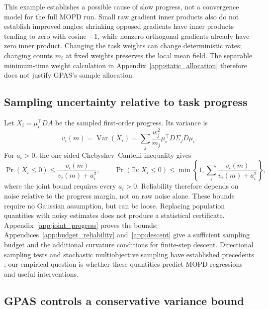 This example establishes a possible cause of slow progress, not a
convergence model for the full MOPD run. Small raw gradient inner products
also do not establish improved angles: shrinking opposed gradients have
inner products tending to zero with cosine $-1$, while nonzero orthogonal
gradients already have zero inner product.
Changing the task weights can change deterministic rates; changing counts
$m_i$ at fixed weights preserves the local mean field. The separable
minimum-time weight calculation in Appendix~\ref{app:static_allocation}
therefore does not justify GPAS's sample allocation.

\subsection{Sampling uncertainty relative to task progress}

Let $X_i=\mu_i^\top DA$ be the sampled first-order progress. Its variance is
\begin{equation}
    v_i(m)=\operatorname{Var}(X_i)
      =\sum_j\frac{w_j^2}{m_j}
          \mu_i^\top D\Sigma_jD\mu_i.
    \label{eq:directional_variance}
\end{equation}
For $a_i>0$, the one-sided Chebyshev--Cantelli inequality gives
\begin{equation}
    \Pr(X_i\leq0)\leq\frac{v_i(m)}{v_i(m)+a_i^2},\qquad
    \Pr(\exists i:X_i\leq0)
      \leq\min\!\left\{1,\sum_i\frac{v_i(m)}{v_i(m)+a_i^2}\right\},
    \label{eq:directional_reliability}
\end{equation}
where the joint bound requires every $a_i>0$. Reliability therefore
depends on noise relative to the progress margin, not on raw noise alone.
These bounds require no Gaussian assumption, but can be loose. Replacing
population quantities with noisy estimates does not produce a statistical
certificate. Appendix~\ref{app:joint_progress} proves the bounds;
Appendices~\ref{app:budget_reliability} and~\ref{app:descent} give a
sufficient sampling budget and the additional curvature conditions for
finite-step descent. Directional sampling tests and stochastic
multiobjective sampling have established precedents
\citep{bollapragada2018adaptive,zhao2024adaptive}; our empirical question
is whether these quantities predict MOPD regressions and useful interventions.

\subsection{GPAS controls a conservative variance bound}

